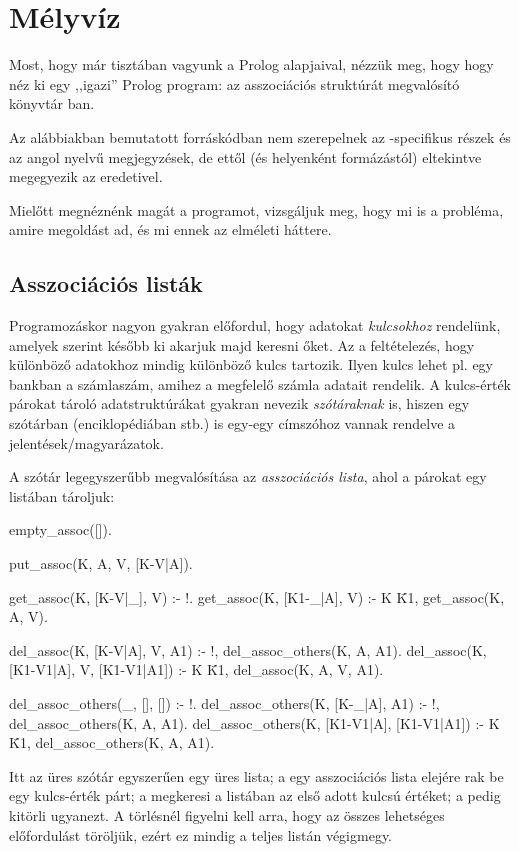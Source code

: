 \chapter{Mélyvíz}
Most, hogy már tisztában vagyunk a Prolog
alapjaival, nézzük meg, hogy hogy néz ki egy
,,igazi'' Prolog program: az asszociációs struktúrát
megvalósító könyvtár ban.

Az alábbiakban bemutatott forráskódban nem
szerepelnek az -specifikus részek
és az angol nyelvű megjegyzések, de ettől (és
helyenként formázástól) eltekintve megegyezik az
eredetivel.

Mielőtt megnéznénk magát a programot, vizsgáljuk
meg, hogy mi is a probléma, amire megoldást ad, és
mi ennek az elméleti háttere.

\section{Asszociációs listák}
Programozáskor nagyon gyakran előfordul, hogy
adatokat \emph{kulcsokhoz} rendelünk, amelyek
szerint később ki akarjuk majd keresni őket. Az a
feltételezés, hogy különböző adatokhoz mindig
különböző kulcs tartozik. Ilyen kulcs lehet pl. egy
bankban a számlaszám, amihez a megfelelő számla
adatait rendelik. A kulcs-érték párokat tároló
adatstruktúrákat gyakran nevezik \emph{szótáraknak}
is, hiszen egy szótárban (enciklopédiában stb.) is
egy-egy címszóhoz vannak rendelve a
jelentések/magyarázatok.

A szótár legegyszerűbb megvalósítása az
\emph{asszociációs lista}, ahol a párokat egy
listában tároljuk: 
\begin{program}
empty_assoc([]).

put_assoc(K, A, V, [K-V|A]).

get_assoc(K, [K-V|_], V) :- !.
get_assoc(K, [K1-_|A], V) :-
    K \= K1, get_assoc(K, A, V).

del_assoc(K, [K-V|A], V, A1) :-
    !, del_assoc_others(K, A, A1).
del_assoc(K, [K1-V1|A], V, [K1-V1|A1]) :-
    K \= K1, del_assoc(K, A, V, A1).

del_assoc_others(_, [], []) :- !.
del_assoc_others(K, [K-_|A], A1) :-
    !, del_assoc_others(K, A, A1).
del_assoc_others(K, [K1-V1|A], [K1-V1|A1]) :-
    K \= K1, del_assoc_others(K, A, A1).
\end{program}
Itt az üres szótár egyszerűen egy üres lista; a
 egy asszociációs lista elejére rak
be egy kulcs-érték párt; a  megkeresi
a listában az első adott kulcsú értéket; a
 pedig kitörli ugyanezt. A törlésnél
figyelni kell arra, hogy az összes lehetséges
előfordulást töröljük, ezért ez mindig a teljes
listán végigmegy.

